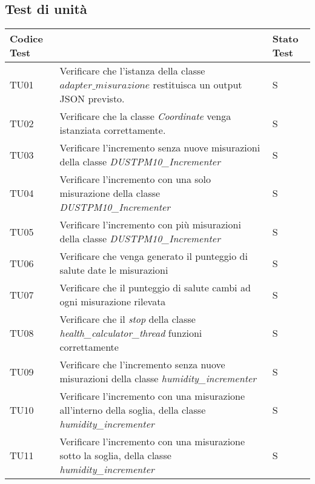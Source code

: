\subsection{Test di unità}

\begin{longtable}{|C{1.9cm}|L{5.5cm}|C{2cm}|}
    \hline
    \textbf{Codice Test} &  & \textbf{Stato Test} \\
    \hline \hline
    
    TU01 & Verificare che l'istanza della classe $\textit{adapter\_misurazione}$ restituisca un output JSON previsto.  & S \\
    \hline

    TU02 & Verificare che la classe \textit{Coordinate} venga istanziata correttamente.  & S \\
    \hline

    TU03 & Verificare l'incremento senza nuove misurazioni della classe \textit{DUSTPM10\_Incrementer} & S \\
    \hline

    TU04 & Verificare l'incremento con una solo misurazione della classe \textit{DUSTPM10\_Incrementer} & S \\
    \hline

    TU05 & Verificare l'incremento con più misurazioni della classe  \textit{DUSTPM10\_Incrementer} & S \\
    \hline

    TU06 & Verificare che venga generato il punteggio di salute date le misurazioni & S \\
    \hline

    TU07 & Verificare che il punteggio di salute cambi ad ogni misurazione rilevata & S \\
    \hline

    TU08 & Verificare che il \textit{stop} della classe \textit{health\_calculator\_thread} funzioni correttamente & S \\
    \hline

    TU09 & Verificare che l'incremento senza nuove misurazioni della classe \textit{humidity\_incrementer} & S \\
    \hline

    TU10 & Verificare l'incremento con una misurazione all'interno della soglia,  della classe \textit{humidity\_incrementer} & S \\
    \hline

    TU11 & Verificare l'incremento con una misurazione sotto la soglia,  della classe \textit{humidity\_incrementer} & S \\
    \hline


\end{longtable}
